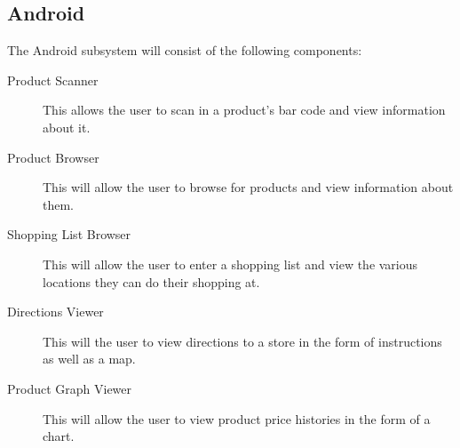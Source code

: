 \subsection{Android}

The Android subsystem will consist of the following components:
\begin{description}
\item [Product Scanner] This allows the user to scan in a product's bar code and view information about it.
\item[Product Browser] This will allow the user to browse for products and view information about them.
\item[Shopping List Browser] This will allow the user to enter a shopping list and view the various locations they can do  their shopping at.
\item[Directions Viewer] This will the user to view directions to a store in the form of instructions as well as a map.
\item[Product Graph Viewer] This will allow the user to view product price histories in the form of a chart.
\end{description} 






